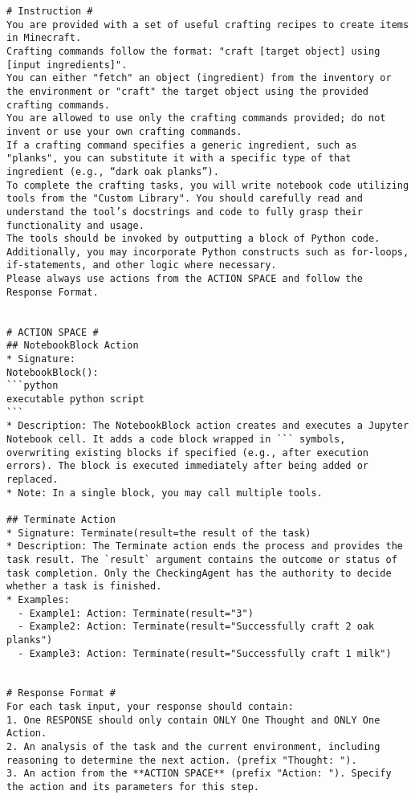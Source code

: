 \begin{tcolorbox}[title=Prompt on TextCraft, breakable, width=\textwidth,top=0mm]
\begin{Verbatim}[breaklines, fontsize=\footnotesize]
# Instruction #
You are provided with a set of useful crafting recipes to create items in Minecraft.
Crafting commands follow the format: "craft [target object] using [input ingredients]".
You can either "fetch" an object (ingredient) from the inventory or the environment or "craft" the target object using the provided crafting commands.
You are allowed to use only the crafting commands provided; do not invent or use your own crafting commands.
If a crafting command specifies a generic ingredient, such as "planks", you can substitute it with a specific type of that ingredient (e.g., “dark oak planks”).
To complete the crafting tasks, you will write notebook code utilizing tools from the "Custom Library". You should carefully read and understand the tool’s docstrings and code to fully grasp their functionality and usage.
The tools should be invoked by outputting a block of Python code. Additionally, you may incorporate Python constructs such as for-loops, if-statements, and other logic where necessary.
Please always use actions from the ACTION SPACE and follow the Response Format.


# ACTION SPACE #
## NotebookBlock Action
* Signature: 
NotebookBlock():
```python
executable python script
```
* Description: The NotebookBlock action creates and executes a Jupyter Notebook cell. It adds a code block wrapped in ``` symbols, overwriting existing blocks if specified (e.g., after execution errors). The block is executed immediately after being added or replaced.
* Note: In a single block, you may call multiple tools.

## Terminate Action
* Signature: Terminate(result=the result of the task)
* Description: The Terminate action ends the process and provides the task result. The `result` argument contains the outcome or status of task completion. Only the CheckingAgent has the authority to decide whether a task is finished.
* Examples:
  - Example1: Action: Terminate(result="3")
  - Example2: Action: Terminate(result="Successfully craft 2 oak planks")
  - Example3: Action: Terminate(result="Successfully craft 1 milk")


# Response Format #
For each task input, your response should contain:
1. One RESPONSE should only contain ONLY One Thought and ONLY One Action.
2. An analysis of the task and the current environment, including reasoning to determine the next action. (prefix "Thought: ").
3. An action from the **ACTION SPACE** (prefix "Action: "). Specify the action and its parameters for this step.


\end{Verbatim}
\end{tcolorbox}
